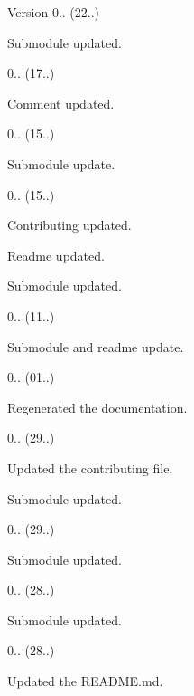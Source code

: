 \begin{DoxyVersion}{Version}
0.. (22..)
\begin{DoxyItemize}
\item Submodule updated. 
\end{DoxyItemize}

0.. (17..)
\begin{DoxyItemize}
\item Comment updated. 
\end{DoxyItemize}

0.. (15..)
\begin{DoxyItemize}
\item Submodule update. 
\end{DoxyItemize}

0.. (15..)
\begin{DoxyItemize}
\item Contributing updated.
\item Readme updated.
\item Submodule updated. 
\end{DoxyItemize}

0.. (11..)
\begin{DoxyItemize}
\item Submodule and readme update. 
\end{DoxyItemize}

0.. (01..)
\begin{DoxyItemize}
\item Regenerated the documentation. 
\end{DoxyItemize}

0.. (29..)
\begin{DoxyItemize}
\item Updated the contributing file.
\item Submodule updated. 
\end{DoxyItemize}

0.. (29..)
\begin{DoxyItemize}
\item Submodule updated. 
\end{DoxyItemize}

0.. (28..)
\begin{DoxyItemize}
\item Submodule updated. 
\end{DoxyItemize}

0.. (28..)
\begin{DoxyItemize}
\item Updated the R\+E\+A\+D\+M\+E.\+md. 
\end{DoxyItemize}


\end{DoxyVersion}
